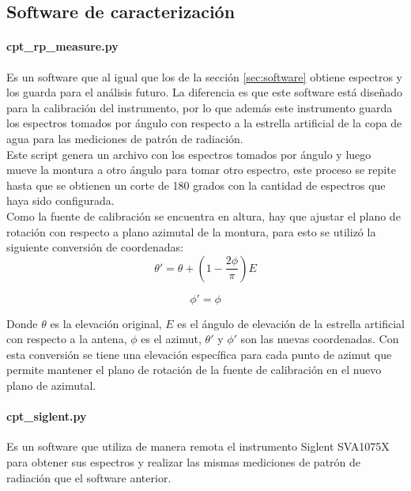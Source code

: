 \subsection{Software de caracterización}

\paragraph{cpt\_rp\_measure.py} Es un software que al igual que los de la sección \ref{sec:software} obtiene espectros y los guarda para el análisis futuro. La diferencia es que este software está diseñado para la calibración del instrumento, por lo que además este instrumento guarda los espectros tomados por ángulo con respecto a la estrella artificial de la copa de agua para las mediciones de patrón de radiación.\\

Este script genera un archivo con los espectros tomados por ángulo y luego mueve la montura a otro ángulo para tomar otro espectro, este proceso se repite hasta que se obtienen un corte de 180 grados con la cantidad de espectros que haya sido configurada.\\

Como la fuente de calibración se encuentra en altura, hay que ajustar el plano de rotación con respecto a plano azimutal de la montura, para esto se utilizó la siguiente conversión de coordenadas:\\

\begin{equation}
    \theta' = \theta + \left(1- \frac{2\phi}{\pi}\right)E
\end{equation}

\begin{equation}
    \phi' = \phi
\end{equation}

Donde $\theta$ es la elevación original, $E$ es el ángulo de elevación de la estrella artificial con respecto a la antena, $\phi$ es el azimut, $\theta'$ y $\phi'$ son las nuevas coordenadas. Con esta conversión se tiene una elevación específica para cada punto de azimut que permite mantener el plano de rotación de la fuente de calibración en el nuevo plano de azimutal.\\

\paragraph{cpt\_siglent.py} Es un software que utiliza de manera remota el instrumento Siglent SVA1075X para obtener sus espectros y realizar las mismas mediciones de patrón de radiación que el software anterior.\\